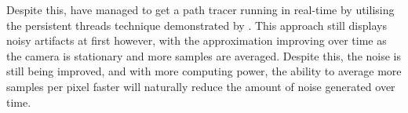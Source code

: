Despite this, \citeauthor{bikker13brigade} have managed to get a path tracer running in real-time by utilising the persistent threads technique demonstrated by \cite{aila2009hpg}. This approach still displays noisy artifacts at first however, with the approximation improving over time as the camera is stationary and more samples are averaged. Despite this, the noise is still being improved, and with more computing power, the ability to average more samples per pixel faster will naturally reduce the amount of noise generated over time.